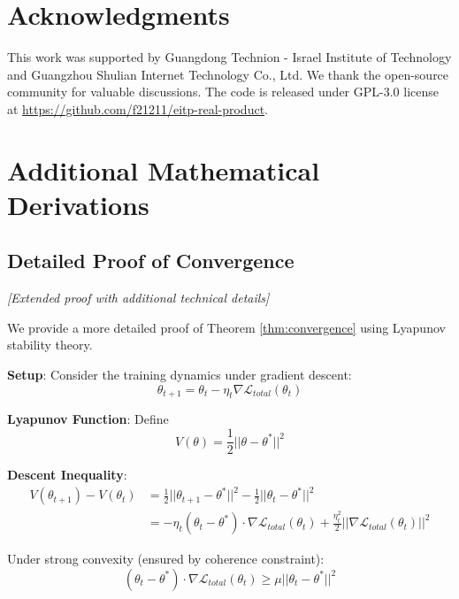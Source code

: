\documentclass[12pt]{article}
\begin{document}
\section{Acknowledgments}

This work was supported by Guangdong Technion - Israel Institute of Technology and Guangzhou Shulian Internet Technology Co., Ltd. We thank the open-source community for valuable discussions. The code is released under GPL-3.0 license at \url{https://github.com/f21211/eitp-real-product}.




\appendix

\section{Additional Mathematical Derivations}

\subsection{Detailed Proof of Convergence}

\textit{[Extended proof with additional technical details]}

We provide a more detailed proof of Theorem \ref{thm:convergence} using Lyapunov stability theory.

\textbf{Setup}: Consider the training dynamics under gradient descent:
\begin{equation}
\theta_{t+1} = \theta_t - \eta_t \nabla \mathcal{L}_{total}(\theta_t)
\end{equation}

\textbf{Lyapunov Function}: Define
\begin{equation}
V(\theta) = \frac{1}{2}||\theta - \theta^*||^2
\end{equation}

\textbf{Descent Inequality}: 
\begin{align}
V(\theta_{t+1}) - V(\theta_t) &= \frac{1}{2}||\theta_{t+1} - \theta^*||^2 - \frac{1}{2}||\theta_t - \theta^*||^2 \\
&= -\eta_t (\theta_t - \theta^*) \cdot \nabla \mathcal{L}_{total}(\theta_t) + \frac{\eta_t^2}{2}||\nabla \mathcal{L}_{total}(\theta_t)||^2
\end{align}

Under strong convexity (ensured by coherence constraint):
\begin{equation}
(\theta_t - \theta^*) \cdot \nabla \mathcal{L}_{total}(\theta_t) \geq \mu ||\theta_t - \theta^*||^2
\end{equation}
\end{document}
